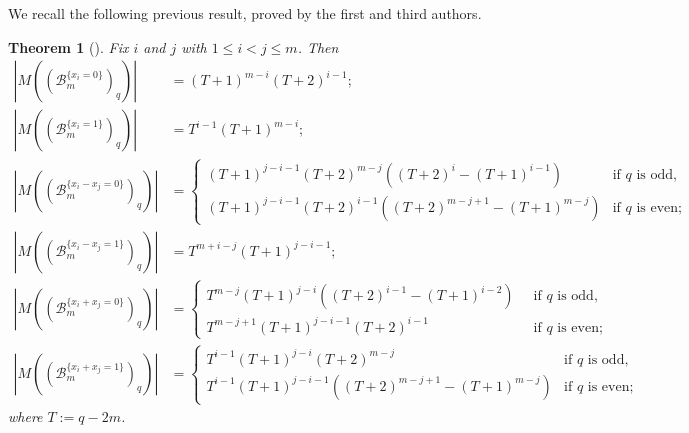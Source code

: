 \documentclass{article}
\theoremstyle{plain}
\newtheorem{Them}{Theorem}[section]
\theoremstyle{definition}
\theoremstyle{remark}
\numberwithin{equation}{section}
\newcommand{\Bc}{\mathcal{B}}
\begin{document}
We recall the following previous result, proved by the first and third authors. 
\begin{Them}[{\cite[Theorem 1.3]{HN2024}}]\label{typeB}
Fix $i$ and $j$ with $1\leq i<j \leq m$. Then 
\begin{align*}
\left|M((\Bc_m^{\{x_i=0\}})_q)\right|&= (T+1)^{m-i}(T+2)^{i-1}; \\
\left|M((\Bc_m^{\{x_i=1\}})_q)\right|&= T^{i-1}(T+1)^{m-i}; \\
\left|M((\Bc_m^{\{x_i-x_j=0\}})_q)\right|&=
\begin{cases}
(T+1)^{j-i-1}(T+2)^{m-j}((T+2)^i-(T+1)^{i-1}) \;\;&\text{if $q$ is odd}, \\
(T+1)^{j-i-1}(T+2)^{i-1}((T+2)^{m-j+1}-(T+1)^{m-j}) &\text{if $q$ is even}; 
\end{cases} \\
\left|M((\Bc_m^{\{x_i-x_j=1\}})_q)\right|&=T^{m+i-j}(T+1)^{j-i-1}; \\
\left|M((\Bc_m^{\{x_i+x_j=0\}})_q)\right|&=
\begin{cases}
T^{m-j}(T+1)^{j-i}((T+2)^{i-1}-(T+1)^{i-2}) \;\;&\text{if $q$ is odd}, \\
T^{m-j+1}(T+1)^{j-i-1}(T+2)^{i-1} &\text{if $q$ is even}; 
\end{cases} \\
\left|M((\Bc_m^{\{x_i+x_j=1\}})_q)\right|&=
\begin{cases}
T^{i-1}(T+1)^{j-i}(T+2)^{m-j} \;\;&\text{if $q$ is odd}, \\
T^{i-1}(T+1)^{j-i-1}((T+2)^{m-j+1}-(T+1)^{m-j}) &\text{if $q$ is even}; 
\end{cases}
\end{align*}
where $T:=q-2m$. 
\end{Them}
\end{document}
